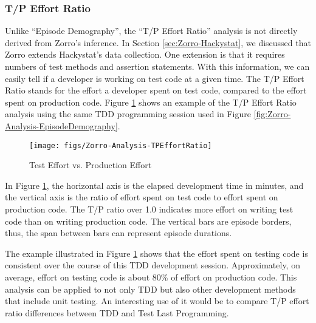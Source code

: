 \subsubsection{T/P Effort Ratio}
Unlike ``Episode Demography'', the ``T/P Effort Ratio'' analysis is not 
directly derived from Zorro's inference. In Section \ref{sec:Zorro-Hackystat},
we discussed that Zorro extends Hackystat's data collection. One 
extension is that it requires numbers of test methods and assertion 
statements. With this information, we can easily tell if a developer 
is working on test code at a given time. The T/P Effort
Ratio stands for the effort a developer spent on test code, 
compared to the effort spent on production code. 
Figure \ref{fig:Zorro-Analysis-TPEffortRatio} shows an example
of the T/P Effort Ratio analysis using the same TDD programming 
session used in Figure \ref{fig:Zorro-Analysis-EpisodeDemography}.
\begin{figure}[htbp]
  \centering
  \texttt{[image: figs/Zorro-Analysis-TPEffortRatio]}
  \caption{Test Effort vs. Production Effort}
  \label{fig:Zorro-Analysis-TPEffortRatio}
\end{figure}
In Figure \ref{fig:Zorro-Analysis-TPEffortRatio}, the horizontal axis
is the elapsed development time in minutes, and the vertical axis is
the ratio of effort spent on test code to effort spent on production
code. The T/P ratio over 1.0 indicates more effort on writing
test code than on writing production code. The vertical bars are
episode borders, thus, the span between bars can represent episode 
durations.  

The example illustrated in Figure 
\ref{fig:Zorro-Analysis-TPEffortRatio} shows that the effort spent on
testing code is consistent over the course of this TDD development session. 
Approximately, on average, effort on testing code is about 80\% of effort
on production code. This analysis can be applied to not only TDD but also 
other development methods that include unit testing. An interesting use 
of it would be to compare T/P effort ratio differences between TDD and 
Test Last Programming. 

